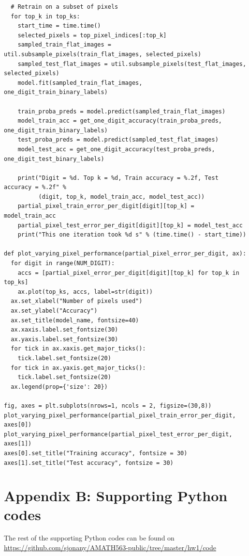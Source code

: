\documentclass[letterpaper, 10 pt, conference]{ieeeconf}  %
\begin{document}
\begin{verbatim}
  # Retrain on a subset of pixels
  for top_k in top_ks:
    start_time = time.time()
    selected_pixels = top_pixel_indices[:top_k]
    sampled_train_flat_images = util.subsample_pixels(train_flat_images, selected_pixels)
    sampled_test_flat_images = util.subsample_pixels(test_flat_images, selected_pixels)
    model.fit(sampled_train_flat_images, one_digit_train_binary_labels)
    
    train_proba_preds = model.predict(sampled_train_flat_images)
    model_train_acc = get_one_digit_accuracy(train_proba_preds, one_digit_train_binary_labels)
    test_proba_preds = model.predict(sampled_test_flat_images)
    model_test_acc = get_one_digit_accuracy(test_proba_preds, one_digit_test_binary_labels)
    
    print("Digit = %d. Top k = %d, Train accuracy = %.2f, Test accuracy = %.2f" % 
          (digit, top_k, model_train_acc, model_test_acc))
    partial_pixel_train_error_per_digit[digit][top_k] = model_train_acc
    partial_pixel_test_error_per_digit[digit][top_k] = model_test_acc
    print("This one iteration took %d s" % (time.time() - start_time))
    
def plot_varying_pixel_performance(partial_pixel_error_per_digit, ax):
  for digit in range(NUM_DIGIT):
    accs = [partial_pixel_error_per_digit[digit][top_k] for top_k in top_ks]
    ax.plot(top_ks, accs, label=str(digit))
  ax.set_xlabel("Number of pixels used")
  ax.set_ylabel("Accuracy")
  ax.set_title(model_name, fontsize=40)
  ax.xaxis.label.set_fontsize(30)
  ax.yaxis.label.set_fontsize(30)
  for tick in ax.xaxis.get_major_ticks():
    tick.label.set_fontsize(20) 
  for tick in ax.yaxis.get_major_ticks():
    tick.label.set_fontsize(20) 
  ax.legend(prop={'size': 20})
  
fig, axes = plt.subplots(nrows=1, ncols = 2, figsize=(30,8))
plot_varying_pixel_performance(partial_pixel_train_error_per_digit, axes[0])
plot_varying_pixel_performance(partial_pixel_test_error_per_digit, axes[1])
axes[0].set_title("Training accuracy", fontsize = 30)
axes[1].set_title("Test accuracy", fontsize = 30)
\end{verbatim}
\section*{Appendix B: Supporting Python codes}
The rest of the supporting Python codes can be found on \url{https://github.com/sjonany/AMATH563-public/tree/master/hw1/code}
\end{document}
